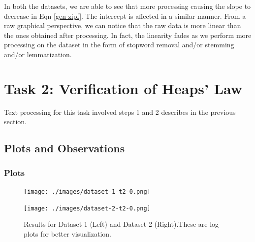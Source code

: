 \documentclass{article}
\begin{document}
\begin{flushleft}
In both the datasets, we are able to see that more processing causing the slope to decrease in Eqn \ref{gen-zipf}. The intercept is affected in a similar manner. From a raw graphical perspective, we can notice that the raw data is more linear than the ones obtained after processing. In fact, the linearity fades as we perform more processing on the dataset in the form of stopword removal and/or stemming and/or lemmatization.
\end{flushleft}

\section{Task 2: Verification of Heaps' Law}
Text processing for this task involved steps 1 and 2 describes in the previous section.
\subsection{Plots and Observations}
\subsubsection{Plots}
\begin{flushleft}
\begin{figure}[H]
\begin{minipage}{0.45\linewidth}
\centering
\texttt{[image: ./images/dataset-1-t2-0.png]}
\end{minipage}
\hfill
\begin{minipage}{0.45\linewidth}
\centering
\texttt{[image: ./images/dataset-2-t2-0.png]}
\end{minipage}
\caption{Results for Dataset 1 (Left) and Dataset 2 (Right).\newline{}These are log plots for better visualization.}
\end{figure}
\end{flushleft}
\end{document}

